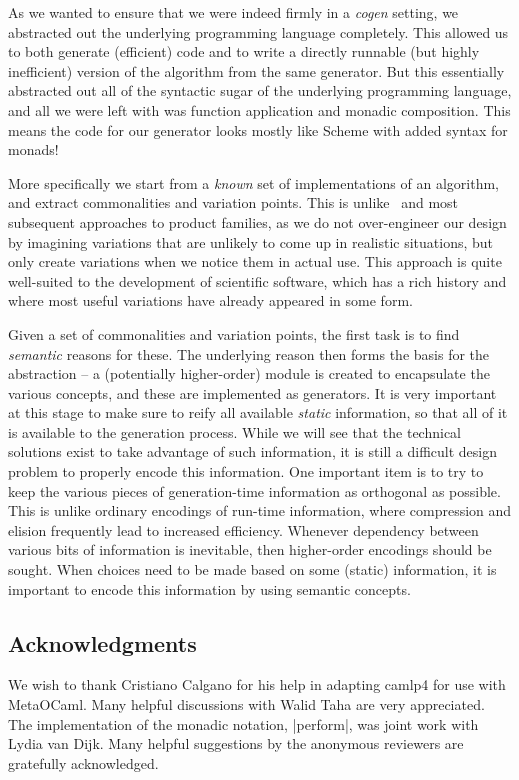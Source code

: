 \documentclass{elsart}
\begin{document}
As we wanted to ensure that we were indeed firmly in a \emph{cogen} setting,
we abstracted out the underlying programming language completely.  This 
allowed us to both generate (efficient) code and to write a directly
runnable (but highly inefficient) version of the algorithm from the same
generator.  But this
essentially abstracted out all of the syntactic sugar of the underlying
programming language, and all we were left with was function application
and monadic composition.  This means the code for our generator looks mostly
like Scheme with added syntax for monads!

More specifically we start from a \emph{known} set of implementations
of an algorithm, and extract commonalities and variation points.
This is unlike~\cite{journals/tse/Parnas76} and most subsequent
approaches to product families, as we do not over-engineer our design
by imagining variations that are unlikely to come up in realistic
situations, but only create variations when we notice them in actual use.
This approach is quite well-suited to the development of scientific
software, which has a rich history and where most useful variations have
already appeared in some form.

Given a set of commonalities and variation points, the first task is to
find \emph{semantic} reasons for these.  The underlying reason then
forms the basis for the abstraction -- a (potentially higher-order)
module is created to encapsulate the various concepts, and these are
implemented as generators.  It is very important at this stage to
make sure to reify all available \emph{static} information, so that all
of it is available to the generation process.  While we will see that
the technical solutions exist to take advantage of such information,
it is still a difficult design problem to properly encode this information.
One important item is to try to keep the various pieces of generation-time
information as orthogonal as possible.  This is unlike ordinary encodings
of run-time information, where compression and elision frequently lead
to increased efficiency.  Whenever dependency between various bits of
information is
inevitable, then higher-order encodings should be sought.  When choices
need to be made based on some (static) information, it is important to
encode this information by using semantic concepts.

\subsection*{Acknowledgments}
We wish to thank Cristiano Calgano for his help in adapting camlp4 for
use with MetaOCaml. Many helpful discussions with Walid Taha are very
appreciated. The implementation of the monadic notation, |perform|,
was joint work with Lydia van Dijk.
Many helpful suggestions by the anonymous reviewers are gratefully
acknowledged.
\end{document}
